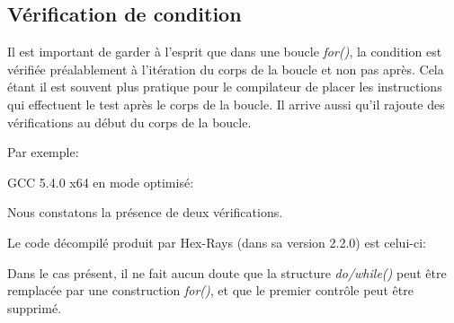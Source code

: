 ﻿\subsection{Vérification de condition}

Il est important de garder à l'esprit que dans une boucle \emph{for()}, la condition est vérifiée 
préalablement à l'itération du corps de la boucle et non pas après. Cela étant il est souvent plus 
pratique pour le compilateur de placer les instructions qui effectuent le test après le corps de 
la boucle. Il arrive aussi qu'il rajoute des vérifications au début du corps de la boucle.

Par exemple:



GCC 5.4.0 x64 en mode optimisé:



Nous constatons la présence de deux vérifications.

Le code décompilé produit par Hex-Rays (dans sa version 2.2.0) est celui-ci:



Dans le cas présent, il ne fait aucun doute que la structure \emph{do/while()} peut être remplacée par 
une construction \emph{for()}, et que le premier contrôle peut être supprimé.

